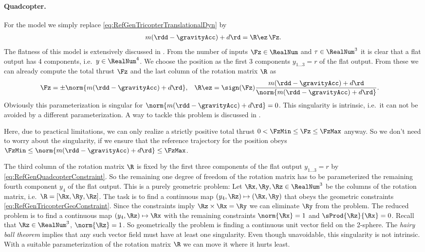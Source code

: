 \paragraph{Quadcopter.}
For the \Quadcopter model we simply replace \eqref{eq:RefGenTricopterTranslationalDyn} by
\begin{align}
  m(\rdd-\gravityAcc) + d \rd = \R \ez \, \Fz.
\end{align}
The flatness of this model is extensively discussed in \cite{Konz:QuadrotorMovingFrame}.
From the number of inputs $\Fz \in \RealNum$ and $\tau \in \RealNum^3$ it is clear that a flat output has 4 components, i.e.\ $y \in \RealNum^4$.
We choose the position as the first 3 components $y_{1\ldots3} = r$ of the flat output.
From these we can already compute the total thrust $\Fz$ and the last column of the rotation matrix $\R$ as
\begin{align}\label{eq:RefGenQuadcopterConstraint}
 \Fz &= \pm \norm{m(\rdd-\gravityAcc) + d \rd},&
 \R \ez &= \sign(\Fz) \frac{m(\rdd-\gravityAcc) + d \rd}{\norm{m(\rdd-\gravityAcc) + d \rd}}.
\end{align}
Obviously this parameterization is singular for $\norm{m(\rdd-\gravityAcc) + d \rd} = 0$.
This singularity is intrinsic, i.e.\ it can not be avoided by a different parameterization.
A way to tackle this problem is discussed in \cite{Lenoir:2kPi}.

Here, due to practical limitations, we can only realize a strictly positive total thrust $0 < \FzMin \leq \Fz \leq \FzMax$ anyway.
So we don't need to worry about the singularity, if we ensure that the reference trajectory for the position obeys $\FzMin \leq \norm{m(\rdd-\gravityAcc) + d \rd} \leq \FzMax$.

The third column of the rotation matrix $\R$ is fixed by the first three components of the flat output $y_{1\ldots3} = r$ by \eqref{eq:RefGenQuadcopterConstraint}. 
So the remaining one degree of freedom of the rotation matrix has to be parameterized the remaining fourth component $y_4$ of the flat output.
This is a purely geometric problem:
Let $\Rx, \Ry, \Rz \in \RealNum^3$ be the columns of the rotation matrix, i.e.\ $\R = [\Rx,\Ry,\Rz]$.
The task is to find a continuous map $(y_4, \Rz) \mapsto (\Rx, \Ry)$ that obeys the geometric constraints \eqref{eq:RefGenTricopterGeoConstraint}.
Since the constraints imply $\Rz\times\Rx = \Ry$ we can eliminate $\Ry$ from the problem.
The reduced problem is to find a continuous map $(y_4, \Rz) \mapsto \Rx$ with the remaining constraints $\norm{\Rx} = 1$ and $\sProd{\Rz}{\Rx} = 0$.
Recall that $\Rz \in \RealNum^3$, $\norm{\Rz}=1$.
So geometrically the problem is finding a continuous unit vector field on the 2-sphere.
The \textit{hairy ball theorem} \cite{Brouwer:HairyBallTheorem} implies that any such vector field must have at least one singularity.
Even though unavoidable, this singularity is not intrinsic.
With a suitable parameterization of the rotation matrix $\R$ we can move it where it hurts least.

